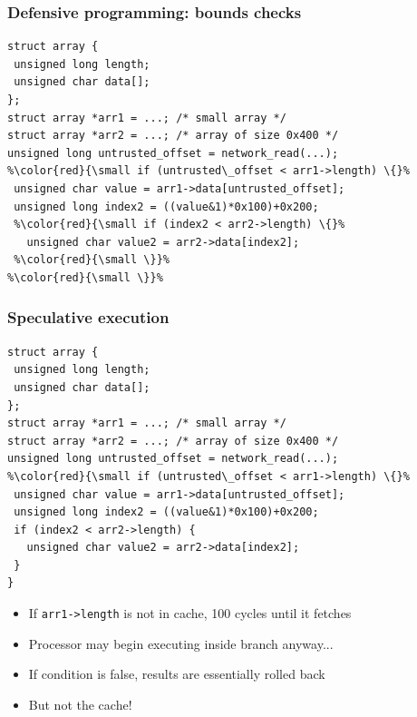 \documentclass[10pt,handout]{beamer}
\begin{document}

\begin{frame}[fragile]

\frametitle{Defensive programming: bounds checks}

\begin{lstlisting}[basicstyle=\small,style=customjava]
struct array {
 unsigned long length;
 unsigned char data[];
};
struct array *arr1 = ...; /* small array */
struct array *arr2 = ...; /* array of size 0x400 */
unsigned long untrusted_offset = network_read(...);
%\color{red}{\small if (untrusted\_offset < arr1->length) \{}%
 unsigned char value = arr1->data[untrusted_offset];
 unsigned long index2 = ((value&1)*0x100)+0x200;
 %\color{red}{\small if (index2 < arr2->length) \{}%
   unsigned char value2 = arr2->data[index2];
 %\color{red}{\small \}}%
%\color{red}{\small \}}%
\end{lstlisting}

\end{frame}


\begin{frame}[fragile]

\frametitle{Speculative execution}

\begin{lstlisting}[basicstyle=\small,style=customjava]
struct array {
 unsigned long length;
 unsigned char data[];
};
struct array *arr1 = ...; /* small array */
struct array *arr2 = ...; /* array of size 0x400 */
unsigned long untrusted_offset = network_read(...);
%\color{red}{\small if (untrusted\_offset < arr1->length) \{}%
 unsigned char value = arr1->data[untrusted_offset];
 unsigned long index2 = ((value&1)*0x100)+0x200;
 if (index2 < arr2->length) {
   unsigned char value2 = arr2->data[index2];
 }
}
\end{lstlisting}

\begin{itemize}
\item If \texttt{arr1->length} is not in cache, 100 cycles until it fetches
\pause

\item Processor may begin executing inside branch anyway...
\pause

\item If condition is false, results are essentially rolled back
\pause

\item But not the cache!

\end{itemize}

\end{frame}
\end{document}

